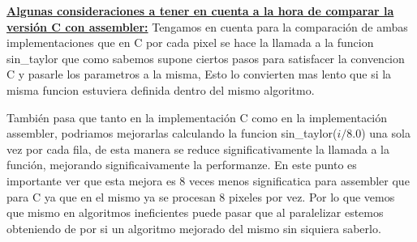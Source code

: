 \underline{\textbf{Algunas consideraciones a tener en cuenta a la hora de comparar la versión C con assembler:}}
Tengamos en cuenta para la comparación de ambas implementaciones que en C por cada pixel se hace la llamada a la funcion sin_taylor que como sabemos supone ciertos pasos para satisfacer la convencion C y pasarle los parametros a la misma, Esto lo convierten mas lento que si la misma funcion estuviera definida dentro del mismo algoritmo.

También pasa que tanto en la implementación C como en la implementación assembler, podriamos mejorarlas calculando la funcion sin_taylor($i/8.0$) una sola vez por cada fila, de esta manera se reduce significativamente la llamada a la función, mejorando significaivamente la performanze. En este punto es importante ver que esta mejora es $8$ veces menos significatica para assembler que para C ya que en el mismo ya se procesan 8 pixeles por vez. Por lo que vemos que mismo en algoritmos ineficientes puede pasar que al paralelizar estemos obteniendo de por si un algoritmo mejorado del mismo sin siquiera saberlo.


